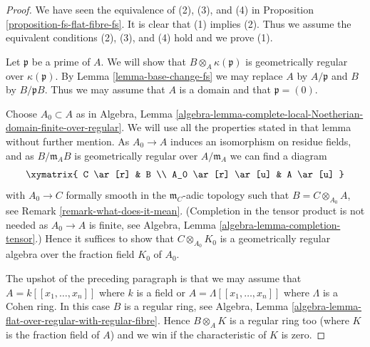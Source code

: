 \begin{proof}
We have seen the equivalence of (2), (3), and (4) in
Proposition \ref{proposition-fs-flat-fibre-fs}.
It is clear that (1) implies (2).
Thus we assume the equivalent conditions (2), (3), and (4) hold
and we prove (1).

\medskip\noindent
Let $\mathfrak p$ be a prime of $A$. We will show that
$B \otimes_A \kappa(\mathfrak p)$ is geometrically regular
over $\kappa(\mathfrak p)$.
By Lemma \ref{lemma-base-change-fs}
we may replace $A$ by $A/\mathfrak p$ and $B$ by $B/\mathfrak pB$.
Thus we may assume that $A$ is a domain and that $\mathfrak p = (0)$.

\medskip\noindent
Choose $A_0 \subset A$ as in Algebra, Lemma
\ref{algebra-lemma-complete-local-Noetherian-domain-finite-over-regular}.
We will use all the properties stated in that lemma without further mention.
As $A_0 \to A$ induces an isomorphism on residue fields, and as
$B/\mathfrak m_A B$ is geometrically regular over $A/\mathfrak m_A$
we can find a diagram
$$
\xymatrix{
C \ar[r] & B \\
A_0 \ar[r] \ar[u] & A \ar[u]
}
$$
with $A_0 \to C$ formally smooth in the $\mathfrak m_C$-adic topology
such that $B = C \otimes_{A_0} A$, see Remark \ref{remark-what-does-it-mean}.
(Completion in the tensor product is not needed as $A_0 \to A$ is
finite, see Algebra, Lemma \ref{algebra-lemma-completion-tensor}.)
Hence it suffices to show that $C \otimes_{A_0} K_0$
is a geometrically regular algebra over the fraction field $K_0$ of $A_0$.

\medskip\noindent
The upshot of the preceding paragraph is that we may assume that
$A = k[[x_1, \ldots, x_n]]$ where $k$ is a field or
$A = \Lambda[[x_1, \ldots, x_n]]$ where $\Lambda$ is a Cohen ring.
In this case $B$ is a regular ring, see
Algebra, Lemma \ref{algebra-lemma-flat-over-regular-with-regular-fibre}.
Hence $B \otimes_A K$ is a regular ring too (where $K$ is the
fraction field of $A$) and we win
if the characteristic of $K$ is zero.


\end{proof}
